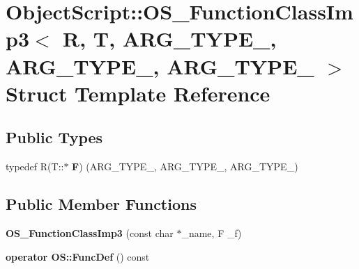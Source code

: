 \hypertarget{struct_object_script_1_1_o_s___function_class_imp3}{}\section{Object\+Script\+:\+:O\+S\+\_\+\+Function\+Class\+Imp3$<$ R, T, A\+R\+G\+\_\+\+T\+Y\+P\+E\+\_, A\+R\+G\+\_\+\+T\+Y\+P\+E\+\_, A\+R\+G\+\_\+\+T\+Y\+P\+E\+\_ $>$ Struct Template Reference}
\label{struct_object_script_1_1_o_s___function_class_imp3}
\subsection*{Public Types}
\begin{DoxyCompactItemize}
\item 
typedef R(T\+::$\ast$ {\bfseries F}) (A\+R\+G\+\_\+\+T\+Y\+P\+E\+\_, A\+R\+G\+\_\+\+T\+Y\+P\+E\+\_, A\+R\+G\+\_\+\+T\+Y\+P\+E\+\_)\hypertarget{struct_object_script_1_1_o_s___function_class_imp3_a274306d0485f1a272c828d0aa7914898}{}\label{struct_object_script_1_1_o_s___function_class_imp3_a274306d0485f1a272c828d0aa7914898}

\end{DoxyCompactItemize}
\subsection*{Public Member Functions}
\begin{DoxyCompactItemize}
\item 
{\bfseries O\+S\+\_\+\+Function\+Class\+Imp3} (const char $\ast$\+\_\+name, F \+\_\+f)\hypertarget{struct_object_script_1_1_o_s___function_class_imp3_a9549c9577450bda7b4ddf17bd5006502}{}\label{struct_object_script_1_1_o_s___function_class_imp3_a9549c9577450bda7b4ddf17bd5006502}

\item 
{\bfseries operator O\+S\+::\+Func\+Def} () const \hypertarget{struct_object_script_1_1_o_s___function_class_imp3_a6c431fdaebb067b49f88d1e2a8e0daa5}{}\label{struct_object_script_1_1_o_s___function_class_imp3_a6c431fdaebb067b49f88d1e2a8e0daa5}

\end{DoxyCompactItemize}
